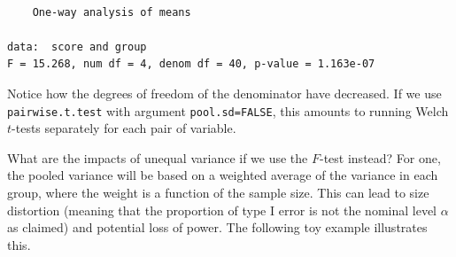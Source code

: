 \documentclass[
  11pt,
  letterpaper,
]{scrbook}
\theoremstyle{definition}
\theoremstyle{definition}
\theoremstyle{remark}
\begin{document}
\begin{verbatim}

    One-way analysis of means

data:  score and group
F = 15.268, num df = 4, denom df = 40, p-value = 1.163e-07
\end{verbatim}

Notice how the degrees of freedom of the denominator have decreased. If
we use \texttt{pairwise.t.test} with argument \texttt{pool.sd=FALSE},
this amounts to running Welch \(t\)-tests separately for each pair of
variable.

What are the impacts of unequal variance if we use the \(F\)-test
instead? For one, the pooled variance will be based on a weighted
average of the variance in each group, where the weight is a function of
the sample size. This can lead to size distortion (meaning that the
proportion of type I error is not the nominal level \(\alpha\) as
claimed) and potential loss of power. The following toy example
illustrates this.
\end{document}
